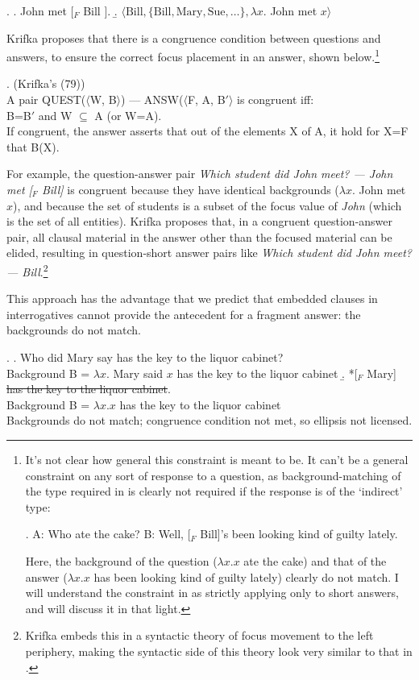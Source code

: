\documentclass[doublespace]{umthesis}
\newcommand{\pred}[1]{\ensuremath{\mathrm{{#1}}}}
\begin{document}
\ex. 	\a. John met [$_F$ Bill ].
	\b. $\langle \pred{Bill}, \{\pred{Bill, Mary, Sue, \ldots}\}, \lambda x. $ John met $x \rangle$
	
Krifka proposes that there is a congruence condition between questions and answers, to ensure the correct focus placement in an answer, shown below.\footnote{It's not clear how general this constraint is meant to be. It can't be a general constraint on any sort of response to a question, as background-matching of the type required in \TextNext is clearly not required if the response is of the `indirect' type:

\ex. 	A: Who ate the cake? B: Well, [$_F$ Bill]'s been looking kind of guilty lately.

Here, the background of the question ($\lambda x. x$ ate the cake) and that of the answer ($\lambda x. x$ has been looking kind of guilty lately) clearly do not match. I will understand the constraint in \TextNext as strictly applying only to short answers, and will discuss it in that light.}

\ex. 	(Krifka's (79))\\
	A pair QUEST($\langle$W, B$\rangle$) --- ANSW($\langle$F, A, B$'\rangle$ is congruent iff:\\
	B=B$'$ and W $\subseteq$ A (or W=A).\\
	If congruent, the answer asserts that out of the elements X of A, it hold for X=F that B(X).
	
For example, the question-answer pair {\it Which student did John meet? --- John met [$_F$ Bill]} is congruent because they have identical backgrounds ($\lambda x. $ John met $x$), and because the set of students is a subset of the focus value of {\it John} (which is the set of all entities). Krifka proposes that, in a congruent question-answer pair, all clausal material in the answer other than the focused material can be elided, resulting in question-short answer pairs like {\it Which student did John meet? --- Bill}.\footnote{Krifka embeds this in a syntactic theory of focus movement to the left periphery, making the syntactic side of this theory look very similar to that in \cite{Me04}.}

This approach has the advantage that we predict that embedded clauses in interrogatives cannot provide the antecedent for a fragment answer: the backgrounds do not match.

\ex. 	\a. Who did Mary say has the key to the liquor cabinet?\\
	    Background B = $\lambda x. $ Mary said $x$ has the key to the liquor cabinet
	\b. *[$_{F}$ Mary] \sout{has the key to the liquor cabinet}.\\
		Background B = $\lambda x. x$ has the key to the liquor cabinet\\
		Backgrounds do not match; congruence condition not met, so ellipsis not licensed.
\end{document}
